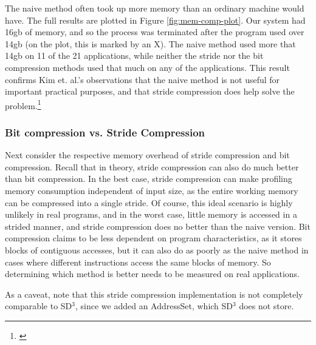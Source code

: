 \documentclass[12pt,twoside]{reedthesis}
\begin{document}
		The naive method often took up more memory than an ordinary machine would have. The full results are plotted in Figure \ref{fig:mem-comp-plot}. Our system had 16gb of memory, and so the process was terminated after the program used over 14gb (on the plot, this is marked by an X). The naive method used more that 14gb on 11 of the 21 applications, while neither the stride nor the bit compression methods used that much on any of the applications. This result confirms Kim et. al.'s observations that the naive method is not useful for important practical purposes, and that stride compression does help solve the problem.\footnote{\cite{Kim:2010}}
		
		
		
		\subsubsection{Bit compression vs. Stride Compression}
		
		Next consider the respective memory overhead of stride compression and bit compression. 
		Recall that in theory, stride compression can also do much better than bit compression. In the best case, stride compression can make profiling memory consumption independent of input size, as the entire working memory can be compressed into a single stride. Of course, this ideal scenario is highly unlikely in real programs, and in the worst case, little memory is accessed in a strided manner, and stride compression does no better than the naive version. Bit compression claims to be less dependent on program characteristics, as it stores blocks of contiguous accesses, but it can also do as poorly as the naive method in cases where different instructions access the same blocks of memory. So determining which method is better needs to be measured on real applications. 
		
		As a caveat, note that this stride compression implementation is not completely comparable to SD$^3$, since we added an AddressSet, which SD$^3$ does not store. %
		
\end{document}
